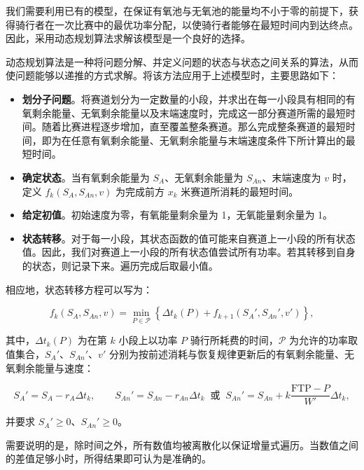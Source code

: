 \documentclass[11pt,a4paper]{ctexart}
\begin{document}
我们需要利用已有的模型，在保证有氧池与无氧池的能量均不小于零的前提下，获得骑行者在一次比赛中的最优功率分配，以使骑行者能够在最短时间内到达终点。因此，采用动态规划算法求解该模型是一个良好的选择。

动态规划算法是一种将问题分解、并定义问题的状态与状态之间关系的算法，从而使问题能够以递推的方式求解。将该方法应用于上述模型时，主要思路如下：

\begin{itemize}
\item \textbf{划分子问题}。将赛道划分为一定数量的小段，并求出在每一小段具有相同的有氧剩余能量、无氧剩余能量以及末端速度时，完成这一部分赛道所需的最短时间。随着比赛进程逐步增加，直至覆盖整条赛道。那么完成整条赛道的最短时间，即为在任意有氧剩余能量、无氧剩余能量与末端速度条件下所计算出的最短时间。
\item \textbf{确定状态}。当有氧剩余能量为 $S_A$、无氧剩余能量为 $S_{An}$、末端速度为 $v$ 时，定义 $f_k(S_A, S_{An}, v)$ 为完成前方 $x_k$ 米赛道所消耗的最短时间。
\item \textbf{给定初值}。初始速度为零，有氧能量剩余量为 1，无氧能量剩余量为 1。
\item \textbf{状态转移}。对于每一小段，其状态函数的值可能来自赛道上一小段的所有状态值。因此，我们对赛道上一小段的所有状态值尝试所有功率。若其转移到自身的状态，则记录下来。遍历完成后取最小值。
\end{itemize}

相应地，状态转移方程可以写为：

\begin{equation}
f_k\left(S_A, S_{An}, v\right) = \min_{P \in \mathcal{P}} \left\{ \Delta t_k\left(P\right) + f_{k+1}\left(S_A', S_{An}', v'\right) \right\},
\end{equation}

其中，$\Delta t_k(P)$ 为在第 $k$ 小段上以功率 $P$ 骑行所耗费的时间，$\mathcal{P}$ 为允许的功率取值集合，$S_A'$、$S_{An}'$、$v'$ 分别为按前述消耗与恢复规律更新后的有氧剩余能量、无氧剩余能量与速度：

\begin{equation}
S_A' = S_A - r_A \Delta t_k, \qquad S_{An}' = S_{An} - r_{An}\Delta t_k \;\; \mbox{或} \;\; S_{An}' = S_{An} + k\frac{\mathrm{FTP} - P}{W'}\Delta t_k ,
\end{equation}

并要求 $S_A' \ge 0$、$S_{An}' \ge 0$。

需要说明的是，除时间之外，所有数值均被离散化以保证增量式遍历。当数值之间的差值足够小时，所得结果即可认为是准确的。
\end{document}
